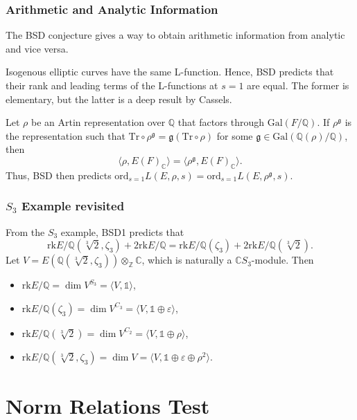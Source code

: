 \documentclass{beamer}
\newcommand{\Gal}{\mathrm{Gal}}
\newcommand{\rk}{\mathrm{rk}}
\newcommand{\Tr}{\mathrm{Tr}}
\newcommand{\ord}{\mathrm{ord}}
\newcommand{\CC}{\mathbb{C}}
\newcommand{\QQ}{\mathbb{Q}}
\newcommand{\ZZ}{\mathbb{Z}}
\theoremstyle{plain}
\begin{document}
\begin{frame}
    \frametitle{Arithmetic and Analytic Information}
    The BSD conjecture gives a way to obtain arithmetic information from analytic and vice versa. \pause
    \begin{example}
        Isogenous elliptic curves have the same L-function. \pause Hence, BSD predicts that their rank and leading terms of the L-functions at $s=1$ are equal. \pause The former is elementary, but the latter is a deep result by Cassels.
    \end{example}
    \begin{example}
        Let $\rho$ be an Artin representation over $\QQ$ that factors through $\Gal(F/\QQ)$. \pause If $\rho^\mathfrak{g}$ is the representation such that $\Tr\circ \rho^\mathfrak{g}=\mathfrak{g}(\Tr\circ\rho)$ for some $\mathfrak{g}\in\Gal(\QQ(\rho)/\QQ)$, then $$\langle\rho,E(F)_\CC\rangle=\langle\rho^\mathfrak{g},E(F)_\CC\rangle.$$ \pause
        Thus, BSD then predicts $\ord_{s=1}L(E,\rho,s)=\ord_{s=1}L(E,\rho^\mathfrak{g},s)$.
    \end{example}
\end{frame}

\fi

\begin{frame}
    \frametitle{$S_3$ Example revisited}
    \begin{example}
        From the $S_3$ example, BSD1 predicts that $$\rk E/\QQ(\sqrt[3]{2},\zeta_3)+2\rk E/\QQ=\rk E/\QQ(\zeta_3)+2\rk E/\QQ(\sqrt[3]{2}).$$ \pause
        Let $V=E(\QQ(\sqrt[3]{2},\zeta_3))\otimes_\ZZ \CC$, which is naturally a $\CC S_3$-module. \pause Then 
        \begin{itemize}
            \item $\rk E/\QQ=\dim V^{S_3}= \langle V,\mathds{1}\rangle$,
            \item $\rk E/\QQ(\zeta_3)=\dim V^{C_3}=\langle V,\mathds{1}\oplus\varepsilon\rangle$,
            \item $\rk E/\QQ(\sqrt[3]{2})=\dim V^{C_2}=\langle V,\mathds{1}\oplus\rho\rangle$,
            \item $\rk E/\QQ(\sqrt[3]{2},\zeta_3)=\dim V=\langle V,\mathds{1}\oplus\varepsilon\oplus\rho^2\rangle$.
        \end{itemize}
    \end{example}

\end{frame}

\section*{Norm Relations Test}
\frame{\sectionpage}
\end{document}
